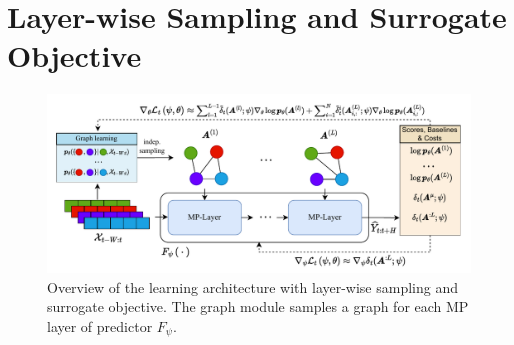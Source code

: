 \section{Layer-wise Sampling and Surrogate Objective}\label{s:surrogate}


\begin{figure}
    \centering
    \includegraphics[scale=0.8]{imgs/graph-learning-large.pdf}
    \caption{Overview of the learning architecture with layer-wise sampling and surrogate objective. The graph module samples a graph for each MP layer of predictor $F_\psi$.}
    \label{fig:framework-extended}
\end{figure}

